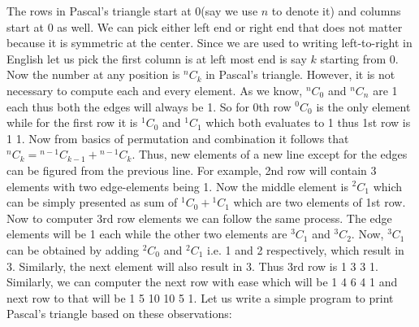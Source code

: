 The rows in Pascal's triangle start at 0(say we use $n$ to denote it) and
columns start at 0 as well. We can pick either left end or right end that does
not matter because it is symmetric at the center. Since we are used to writing
left-to-right in English let us pick the first column is at left most end is
say $k$ starting from 0. Now the number at any position is ${}_{}^nC_k^{}$ in
Pascal's triangle. However, it is not necessary to compute each and every
element. As we know, ${}_{}^nC_0^{}$ and ${}_{}^nC_n^{}$ are 1 each thus both
the edges will always be 1. So for 0th row ${}_{}^0C_0^{}$ is the only element
while for the first row it is ${}_{}^1C_0^{}$ and ${}_{}^1C_1^{}$ which both
evaluates to 1 thus 1st row is 1 1. Now from basics of permutation and
combination it follows that ${}_{}^nC_k^{} = {}_{}^{n-1}C_{k-1}^{} +
{}_{}^{n-1}C_k^{}$. Thus, new elements of a new line except for the edges can
be figured from the previous line. For example, 2nd row will contain 3 elements
with two edge-elements being 1. Now the middle element is ${}_{}^2C_1^{}$ which
can be simply presented as sum of ${}_{}^1C_0^{} + {}_{}^1C_1^{}$ which are two
elements of 1st row. Now to computer 3rd row elements we can follow the same
process. The edge elements will be 1 each while the other two elements are
${}_{}^3C_1^{}$ and ${}_{}^3C_2^{}$. Now, ${}_{}^3C_1^{}$ can be obtained by
adding ${}_{}^2C_0^{}$ and ${}_{}^2C_1^{}$ i.e. 1 and 2 respectively, which
result in 3. Similarly, the next element will also result in 3. Thus 3rd row is
1 3 3 1. Similarly, we can computer the next row with ease which will be 1 4 6
4 1 and next row to that will be 1 5 10 10 5 1. Let us write a simple program
to print Pascal's triangle based on these observations:

